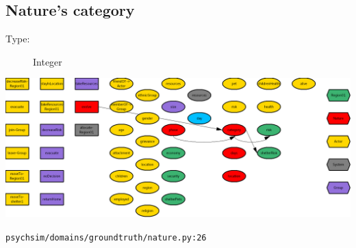 \documentclass{article}%
\begin{document}
\subsection{Nature's category}%
\label{subsec:Nature's category}%
\begin{description}%
\item[Type:]%
Integer%
\end{description}%
\includegraphics[width=\textwidth]{images/categoryOfNature.png}%
\begin{flushleft}%
\verb|psychsim/domains/groundtruth/nature.py:26|%
\end{flushleft}%
\end{document}
